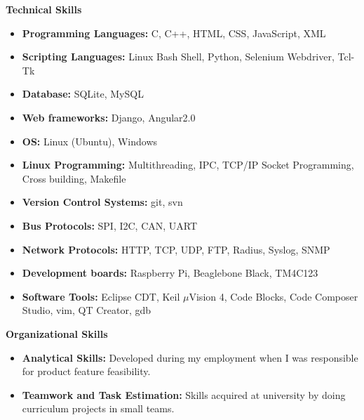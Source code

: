 \documentclass[letterpaper,10pt]{article}
\newcommand{\resheading}[1]{{\large \colorbox{mygrey}{\begin{minipage}{\textwidth}{\textbf{#1 \vphantom{p\^{E}}}}\end{minipage}}}}
\begin{document}
\resheading{Technical Skills}
\begin{itemize}
\item \textbf{Programming Languages:} C, C++, HTML, CSS, JavaScript, XML
\item \textbf{Scripting Languages:} Linux Bash Shell, Python, Selenium Webdriver, Tcl-Tk
\item \textbf{Database:} SQLite, MySQL
\item \textbf{Web frameworks:} Django, Angular2.0
\item \textbf{OS:} Linux (Ubuntu), Windows
\item \textbf{Linux Programming:} Multithreading, IPC, TCP/IP Socket Programming, Cross building, Makefile
\item \textbf{Version Control Systems:} git, svn
\item \textbf{Bus Protocols:} SPI, I2C, CAN, UART
\item \textbf{Network Protocols:} HTTP, TCP, UDP, FTP, Radius, Syslog, SNMP
\item \textbf{Development boards:} Raspberry Pi, Beaglebone Black, TM4C123
\item \textbf{Software Tools:} Eclipse CDT, Keil $\mu$Vision 4, Code Blocks, Code Composer Studio, vim, QT Creator, gdb

\end{itemize}

\resheading{Organizational Skills}
\begin{itemize}
\item \textbf{Analytical Skills:} Developed during my employment when I was responsible for product feature feasibility.
\item \textbf{Teamwork and Task Estimation:} Skills acquired at university by doing curriculum projects in small teams.

\end{itemize}
\end{document}
